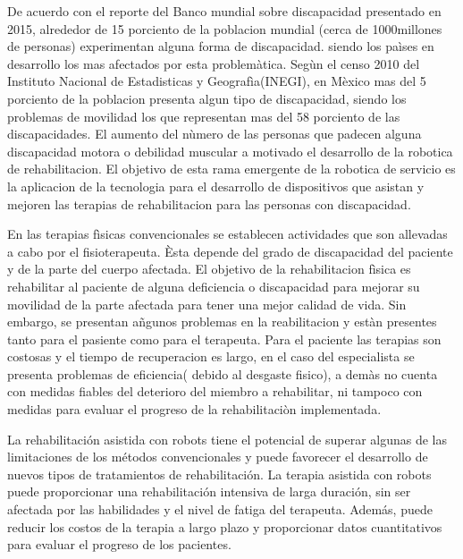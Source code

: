 \documentclass[12pt,letterpaper]{report}
\begin{document}
\begin{flushleft}
\begin{flushleft}
\begin{flushleft}
\begin{flushleft}
\begin{flushleft}
\begin{flushleft}
\begin{flushleft}
De acuerdo con el reporte del Banco mundial sobre discapacidad presentado en 2015, alrededor de 15 porciento de la poblacion mundial (cerca de 1000millones de personas) experimentan alguna forma de discapacidad. siendo los paìses en desarrollo los mas afectados por esta problemàtica. Segùn el censo 2010 del Instituto Nacional de Estadisticas y Geografìa(INEGI), en Mèxico mas del 5 porciento de la poblacion presenta algun tipo de discapacidad, siendo los problemas de movilidad los que representan mas del 58 porciento de las discapacidades. El aumento del nùmero de las personas que padecen alguna discapacidad motora o debilidad muscular a motivado el desarrollo de la robotica de rehabilitacion. El objetivo de esta rama emergente de la robotica de servicio es la aplicacion de la tecnologia para el desarrollo de dispositivos que asistan y mejoren las terapias de rehabilitacion para las personas con discapacidad.
\begin{flushleft}
En las terapias fìsicas convencionales se establecen actividades que son allevadas a cabo por el fisioterapeuta. Èsta depende del grado de discapacidad del paciente y de la parte del cuerpo afectada. El objetivo de la rehabilitacion fìsica es rehabilitar al paciente de alguna deficiencia o discapacidad para mejorar su movilidad de la parte afectada para tener una mejor calidad de vida. Sin embargo, se presentan añgunos problemas en la reabilitacion y estàn presentes tanto para el pasiente como para el terapeuta. Para el paciente las terapias son costosas y el tiempo de recuperacion es largo, en el caso del especialista se presenta problemas de eficiencia( debido al desgaste fisico), a demàs no cuenta con medidas fiables del deterioro del miembro a rehabilitar, ni tampoco con medidas para evaluar el progreso de la rehabilitaciòn implementada.
\begin{flushleft}
La rehabilitación asistida con robots tiene el potencial de superar algunas de las limitaciones de los métodos convencionales y puede favorecer el desarrollo de nuevos tipos de tratamientos de rehabilitación. La terapia asistida con robots puede proporcionar una rehabilitación intensiva de larga duración, sin ser afectada por las habilidades y el nivel de fatiga del terapeuta. Además, puede reducir los costos de la terapia a largo plazo y proporcionar datos cuantitativos para evaluar el progreso de los pacientes.
\begin{flushleft}

\end{flushleft}
\end{flushleft}
\end{flushleft}
\end{flushleft}
\end{flushleft}
\end{flushleft}
\end{flushleft}
\end{flushleft}
\end{flushleft}
\end{flushleft}
\end{document}
